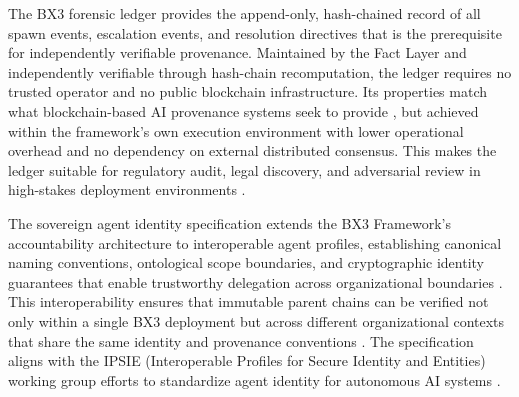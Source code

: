 \documentclass[11pt,oneside]{article}
\begin{document}
The BX3 forensic ledger provides the append-only, hash-chained record of all spawn events, escalation events, and resolution directives that is the prerequisite for independently verifiable provenance. Maintained by the Fact Layer and independently verifiable through hash-chain recomputation, the ledger requires no trusted operator and no public blockchain infrastructure. Its properties match what blockchain-based AI provenance systems seek to provide \cite{on_chain_provenance_ai,blockchain_ai_governance}, but achieved within the framework's own execution environment with lower operational overhead and no dependency on external distributed consensus. This makes the ledger suitable for regulatory audit, legal discovery, and adversarial review in high-stakes deployment environments \cite{bx3framework2026}.

The sovereign agent identity specification extends the BX3 Framework's accountability architecture to interoperable agent profiles, establishing canonical naming conventions, ontological scope boundaries, and cryptographic identity guarantees that enable trustworthy delegation across organizational boundaries \cite{sovereignagent}. This interoperability ensures that immutable parent chains can be verified not only within a single BX3 deployment but across different organizational contexts that share the same identity and provenance conventions \cite{sovereignagent}. The specification aligns with the IPSIE (Interoperable Profiles for Secure Identity and Entities) working group efforts to standardize agent identity for autonomous AI systems \cite{sovereignagent}.



\end{document}
